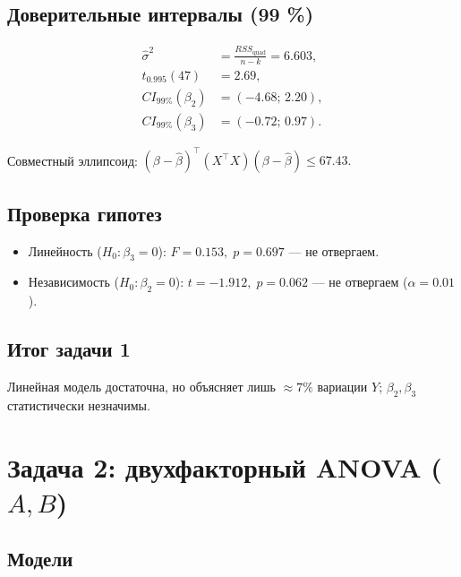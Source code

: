 \documentclass[12pt]{article}
\begin{document}
\subsection{Доверительные интервалы (99 \%)}

\[
\begin{aligned}
  \hat\sigma^2      &= \frac{RSS_{\text{quad}}}{n-k}=6.603,\\
  t_{0.995}(47)     &= 2.69,\\
  CI_{99\%}(\beta_2)&=(-4.68;\,2.20),\\
  CI_{99\%}(\beta_3)&=(-0.72;\,0.97).
\end{aligned}
\]

Совместный эллипсоид:
\(
  (\beta-\hat\beta)^{\!\top}(X^\top X)(\beta-\hat\beta)
  \le 67.43.
\)

\subsection{Проверка гипотез}

\begin{itemize}
  \item Линейность (\(H_0:\beta_3=0\)):
    \(F=0.153,\; p=0.697\) — не отвергаем.
  \item Независимость (\(H_0:\beta_2=0\)):
    \(t=-1.912,\; p=0.062\) — не отвергаем (\(\alpha=0.01\)).
\end{itemize}

\subsection{Итог задачи 1}

Линейная модель достаточна, но объясняет лишь \(\approx7\%\) вариации \(Y\);
\(\beta_2,\beta_3\) статистически незначимы.

\section{Задача 2: двухфакторный ANOVA (\(A,B\))}

\subsection{Модели}
\end{document}
